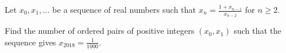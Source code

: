 Let $x_0, x_1, \ldots$ be a sequence of real numbers such that $x_n = \frac{1 + x_{n -1}}{x_{n - 2}}$ for $n \geq 2$.

Find the number of ordered pairs of positive integers $(x_0, x_1)$ such that the sequence gives $x_{2018} = \frac{1}{1000}$.